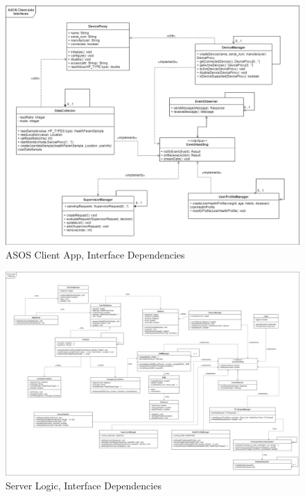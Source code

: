 \begin{flushleft}
{\begin{figure}[H]
	\centering
	\includegraphics[scale=0.28]{images/uml/ASOS_client_interfaces}
	\caption{ASOS Client App, Interface Dependencies}
	\label{Figure 15}
\end{figure}
}

{}

\begin{figure}[H]
	\includegraphics[scale=0.23]{images/uml/server_interfaces}
	\caption{Server Logic, Interface Dependencies}
	\label{Figure 16}
\end{figure}
\newpage



\end{flushleft}
